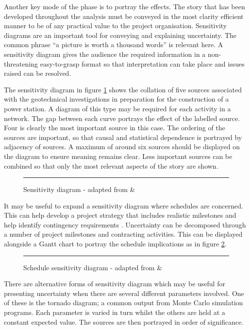 Another key mode of the phase is to portray the effects. 
The story that has been developed throughout the analysis must be conveyed in the most clarity efficient manner to be of any practical value to the project organisation.
Sensitivity diagrams are an important tool for conveying and explaining uncertainty.
The common phrase ``a picture is worth a thousand words'' is relevant here.
A sensitivity diagram gives the audience the required information in a non-threatening easy-to-grasp format so that interpretation can take place and issues raised can be resolved.

The sensitivity diagram in figure \ref{Figure:SensDiag} shows the collation of five sources associated with the geotechnical investigations in preparation for the construction of a power station.
A diagram of this type may be required for each activity in a network.
The gap between each curve portrays the effect of the labelled source.
Four is clearly the most important source in this case. 
The ordering of the sources are important, so that causal and statistical dependence is portrayed by adjacency of sources.
A maximum of around six sources should be displayed on the diagram to ensure meaning remains clear.
Less important sources can be combined so that only the most relevant aspects of the story are shown.

\begin{figure}[!h]
  \centering
  \rule{5cm}{5cm}
\caption{Sensitivity diagram - adapted from \cite{chapman} \& \cite{hopkinson2008}}
\label{Figure:SensDiag}
\end{figure}

It may be useful to expand a sensitivity diagram where schedules are concerned. 
This can help develop a project strategy that includes realistic milestones and help identify contingency requirements \citep{hopkinson2008}.
Uncertainty can be decomposed through a number of project milestones and contracting activities.
This can be displayed alongside a Gantt chart to portray the schedule implications as in figure \ref{Figure:SensDiagGantt}.

\begin{figure}[!h]
  \centering
  \rule{5cm}{5cm}
\caption{Schedule sensitivity diagram - adapted from \cite{hopkinson2008} \& \cite{chapman} }
\label{Figure:SensDiagGantt}
\end{figure}

There are alternative forms of sensitivity diagram which may be useful for presenting uncertainty when there are several different parameters involved. 
One of these is the tornado diagram; a common output from Monte Carlo simulation programs.
Each parameter is varied in turn whilst the others are held at a constant expected value.
The sources are then portrayed in order of significance.

